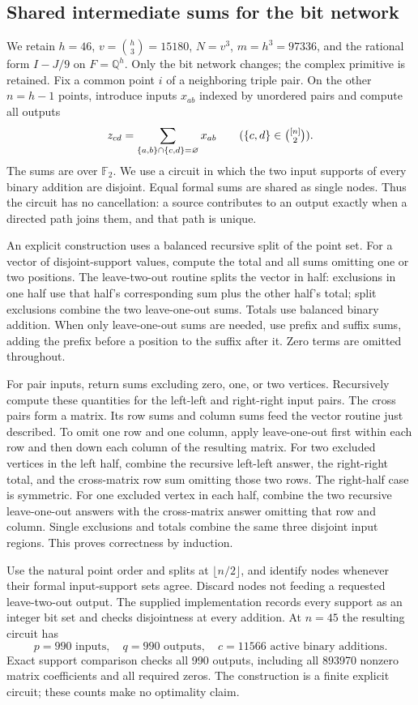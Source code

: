\subsection{Shared intermediate sums for the bit network}
\label{sec:shared-sums}
We retain $h=46$, $v=\binom h3=15180$, $N=v^3$, $m=h^3=97336$, and
the rational form $I-J/9$ on $F=\mathbb Q^h$. Only the bit network changes;
the complex primitive is retained. Fix a common point $i$ of a neighboring
triple pair. On the other $n=h-1$ points, introduce inputs $x_{ab}$ indexed
by unordered pairs and compute all outputs
\[
 z_{cd}=\sum_{\{a,b\}\cap\{c,d\}=\varnothing}x_{ab}
 \qquad(\{c,d\}\in\tbinom{[n]}2).
\]
The sums are over $\mathbb F_2$. We use a circuit in which the two input
supports of every binary addition are disjoint. Equal formal sums are shared
as single nodes. Thus the circuit has no cancellation: a source contributes
to an output exactly when a directed path joins them, and that path is unique.

An explicit construction uses a balanced recursive split of the point set.
For a vector of disjoint-support values, compute the total and all sums
omitting one or two positions. The leave-two-out routine splits the vector
in half: exclusions in one half use that half's corresponding sum plus the
other half's total; split exclusions combine the two leave-one-out sums.
Totals use balanced binary addition. When only leave-one-out sums are needed,
use prefix and suffix sums, adding the prefix before a position to the suffix
after it. Zero terms are omitted throughout.

For pair inputs, return sums excluding zero, one, or two vertices. Recursively
compute these quantities for the left-left and right-right input pairs.
The cross pairs form a matrix. Its row sums and column sums feed the vector
routine just described. To omit one row and one column, apply leave-one-out
first within each row and then down each column of the resulting matrix.
For two excluded vertices in the left half, combine the recursive left-left
answer, the right-right total, and the cross-matrix row sum omitting those
two rows. The right-half case is symmetric. For one excluded vertex in each
half, combine the two recursive leave-one-out answers with the cross-matrix
answer omitting that row and column. Single exclusions and totals combine
the same three disjoint input regions. This proves correctness by induction.

Use the natural point order and splits at $\lfloor n/2\rfloor$, and identify
nodes whenever their formal input-support sets agree. Discard nodes not
feeding a requested leave-two-out output. The supplied implementation records
every support as an integer bit set and checks disjointness at every addition.
At $n=45$ the resulting circuit has
\[
 p=990\text{ inputs},\quad q=990\text{ outputs},\quad c=11566
 \text{ active binary additions}.
\]
Exact support comparison checks all 990 outputs, including all 893970 nonzero
matrix coefficients and all required zeros. The construction is a finite
explicit circuit; these counts make no optimality claim.

